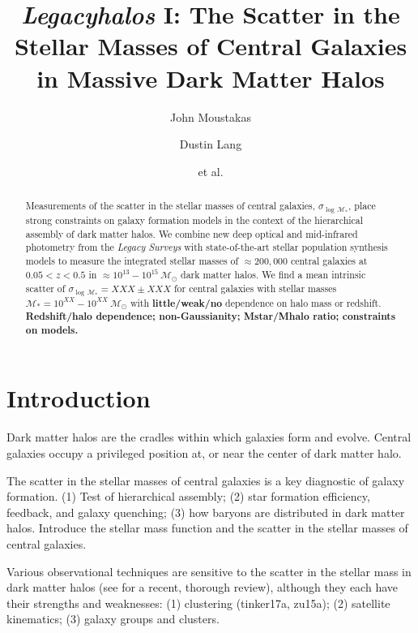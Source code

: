 \documentclass[twocolumn]{aastex62}
\newcommand\LS{\textit{Legacy Surveys}}
\newcommand\mstar{\ensuremath{\mathcal{M}_{*}}}
\newcommand\msun{\ensuremath{\mathcal{M}_{\odot}}}
\newcommand\Mcenscatter{\ensuremath{\sigma_{\log\,\mathcal{M}_{*}}}}
\begin{document}
\title{{\em Legacyhalos} I: The Scatter in the Stellar Masses of Central Galaxies in Massive Dark Matter Halos}


\author[0000-0002-2733-4559]{John Moustakas}

\author{Dustin Lang}

\author{et al.}

\begin{abstract}
Measurements of the scatter in the stellar masses of central galaxies, \Mcenscatter, place strong constraints on galaxy formation models in the context of the hierarchical assembly of dark matter halos.  We combine new deep optical and mid-infrared photometry from the \LS{} with state-of-the-art stellar population synthesis models to measure the integrated stellar masses of $\approx200,000$ central galaxies at $0.05<z<0.5$ in $\approx10^{13}-10^{15}~\msun$ dark matter halos.  We find a mean intrinsic scatter of $\Mcenscatter=XXX\pm XXX$ for central galaxies with stellar masses $\mstar=10^{XX}-10^{XX}~\msun$ with {\bf little/weak/no} dependence on halo mass or redshift.  {\bf Redshift/halo dependence; non-Gaussianity; Mstar/Mhalo ratio; constraints on models.}
\end{abstract}


\section{Introduction}\label{sec:intro}

Dark matter halos are the cradles within which galaxies form and evolve.  Central galaxies occupy a privileged position at, or near the center of dark matter halo.  

The scatter in the stellar masses of central galaxies is a key diagnostic of galaxy formation.  (1) Test of hierarchical assembly; (2) star formation efficiency, feedback, and galaxy quenching; (3) how baryons are distributed in dark matter halos.  Introduce the stellar mass function and the scatter in the stellar masses of central galaxies.

Various observational techniques are sensitive to the scatter in the stellar mass in dark matter halos (see \citealt{wechsler18a} for a recent, thorough review), although they each have their strengths and weaknesses:  (1) clustering (tinker17a, zu15a); (2) satellite kinematics; (3) galaxy groups and clusters.  
\end{document}
